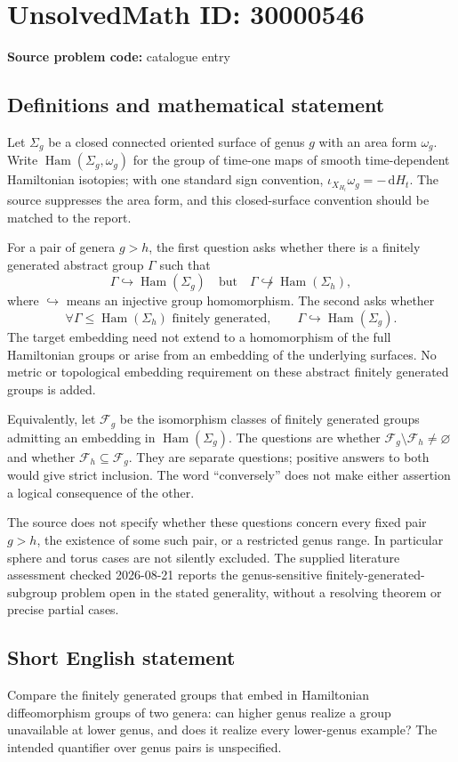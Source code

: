 \documentclass[11pt]{article}
\newcommand{\dd}{\,\mathrm{d}}
\begin{document}
\section*{UnsolvedMath ID: 30000546}
\textbf{Source problem code:} catalogue entry
\subsection{Definitions and mathematical statement}
Let \(\Sigma_g\) be a closed connected oriented surface of genus \(g\) with an area form \(\omega_g\). Write \(\operatorname{Ham}(\Sigma_g,\omega_g)\) for the group of time-one maps of smooth time-dependent Hamiltonian isotopies; with one standard sign convention, \(\iota_{X_{H_t}}\omega_g=-\dd H_t\). The source suppresses the area form, and this closed-surface convention should be matched to the report.

For a pair of genera \(g>h\), the first question asks whether there is a finitely generated abstract group \(\Gamma\) such that
\[
\Gamma\hookrightarrow\operatorname{Ham}(\Sigma_g)
\quad\text{but}\quad
\Gamma\not\hookrightarrow\operatorname{Ham}(\Sigma_h),
\]
where \(\hookrightarrow\) means an injective group homomorphism. The second asks whether
\[
\forall\Gamma\leq\operatorname{Ham}(\Sigma_h)\text{ finitely generated},\qquad
\Gamma\hookrightarrow\operatorname{Ham}(\Sigma_g).
\]
The target embedding need not extend to a homomorphism of the full Hamiltonian groups or arise from an embedding of the underlying surfaces. No metric or topological embedding requirement on these abstract finitely generated groups is added.

Equivalently, let \(\mathscr F_g\) be the isomorphism classes of finitely generated groups admitting an embedding in \(\operatorname{Ham}(\Sigma_g)\). The questions are whether \(\mathscr F_g\setminus\mathscr F_h\ne\varnothing\) and whether \(\mathscr F_h\subseteq\mathscr F_g\). They are separate questions; positive answers to both would give strict inclusion. The word ``conversely'' does not make either assertion a logical consequence of the other.

The source does not specify whether these questions concern every fixed pair \(g>h\), the existence of some such pair, or a restricted genus range. In particular sphere and torus cases are not silently excluded. The supplied literature assessment checked 2026-08-21 reports the genus-sensitive finitely-generated-subgroup problem open in the stated generality, without a resolving theorem or precise partial cases.
\subsection{Short English statement}
Compare the finitely generated groups that embed in Hamiltonian diffeomorphism groups of two genera: can higher genus realize a group unavailable at lower genus, and does it realize every lower-genus example? The intended quantifier over genus pairs is unspecified.
\end{document}
